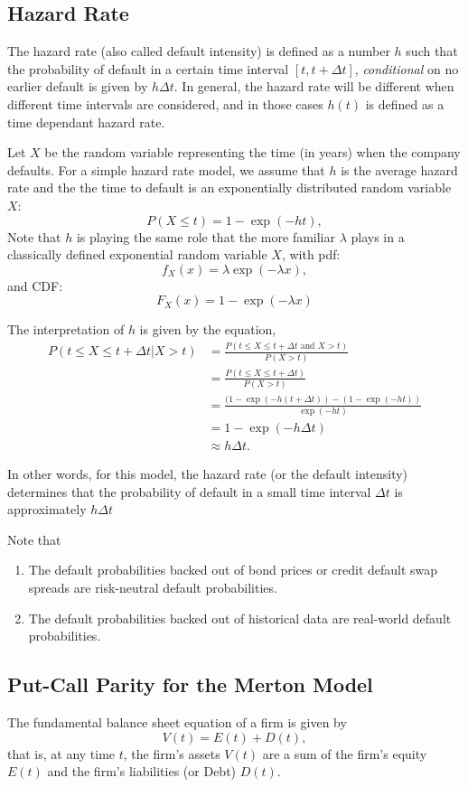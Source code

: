 \documentclass{amsart}
\theoremstyle{plain}
\numberwithin{equation}{section}
\begin{document}
\subsection{Hazard Rate}
The hazard rate (also called default intensity) is defined 
as a number $h$ such that the probability of default in a certain time interval $[t, t+\Delta t]$, \emph{conditional} on no earlier default is given by $h\Delta t$. In general, the hazard rate will be different when different time intervals
are considered, and in those cases $h(t)$ is defined
as a time dependant hazard rate.

Let $X$ be the random variable representing the time (in years)
when the company defaults. For a simple hazard rate model, 
we assume that $h$ is the average hazard rate and the 
the time to default is an exponentially distributed 
random variable $X$:
$$P( X \leq t ) = 1 - \exp( -h t ),$$
Note that $h$ is playing the same role that 
the more familiar $\lambda$ plays in a classically
defined exponential random variable $X$, with pdf:
$$f_X(x) = \lambda \exp(-\lambda x),$$
and CDF:
$$F_X(x) = 1-\exp(-\lambda x)$$

The interpretation of $h$ is given by the equation,
\begin{align*}
P( t \leq X \leq t + \Delta t | X > t ) &=\frac{P( t \leq X \leq t + \Delta t \mbox{ and } X > t )}{P(X >t)}\\
&= \frac{P( t \leq X \leq t + \Delta t)}{P(X >t)}\\
&= \frac{(1-\exp(-h(t+\Delta t))-(1-\exp(-ht))}{\exp(-ht)}\\
&= 1 - \exp(-h\Delta t)\\
& \approx h \Delta t.
\end{align*}

In other words, for this model, the hazard rate (or the default intensity) determines that the probability of 
default in a small time interval $\Delta t$ is approximately 
$h \Delta t$

Note that 
\begin{enumerate}
	\item The default probabilities backed out of bond prices or credit default 
	swap spreads are risk-neutral default probabilities.
	\item The default probabilities backed out of historical data are 
	real-world default probabilities.
\end{enumerate}

\subsection{Put-Call Parity for the Merton Model}
The fundamental balance sheet equation of a firm
is given by
$$V(t) = E(t) + D(t),$$
that is, at any time $t$, the firm's assets $V(t)$ are 
a sum of the firm's equity $E(t)$ and the firm's 
liabilities (or Debt)  $D(t)$.
\end{document}
